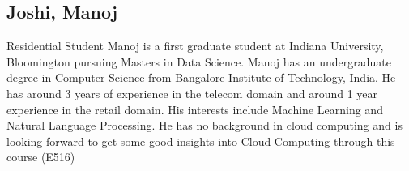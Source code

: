 \subsection{Joshi, Manoj}
Residential Student
Manoj is a first graduate student at Indiana University, Bloomington pursuing Masters in Data Science. 
Manoj has an undergraduate degree in Computer Science from Bangalore Institute of Technology, India. He has around 3 years of experience in the telecom domain and around 1 year experience in the retail domain. His interests include Machine Learning and Natural Language Processing. 
He has no background in cloud computing and is looking forward to get some good insights into Cloud Computing through this course (E516)
